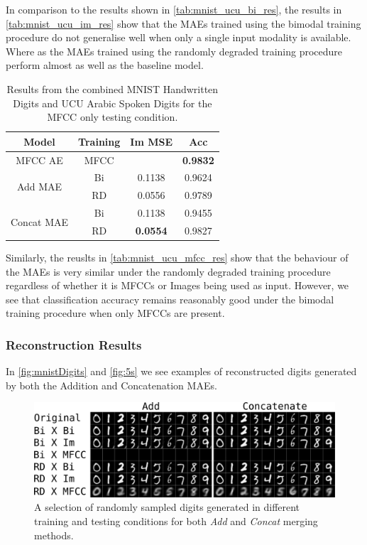 In comparison to the results shown in \autoref{tab:mnist_ucu_bi_res}, the results in \autoref{tab:mnist_ucu_im_res} show that the MAEs trained using the bimodal training procedure do not generalise well when only a single input modality is available. Where as the MAEs trained using the randomly degraded training procedure perform almost as well as the baseline model. 
\begin{table}
	\centering
		\begin{tabular}{|c|c|c|c|}
		\hline
		Model & Training & Im MSE &  Acc \\ \hline
				
				MFCC AE & MFCC & 					& 	\textbf{0.9832}	\\ \hline		
\multirow{2}{*}{Add MAE} & Bi & 	0.1138			& 	0.9624 			\\ \cline{2-4}
						  & RD &	0.0556			&	0.9789			\\ \hline	
		
\multirow{2}{*}{Concat MAE} & Bi &	0.1138			&	0.9455			\\ \cline{2-4}		
							 & RD & \textbf{0.0554}	& 	0.9827 			\\ \hline
		\end{tabular}
		\caption{Results from the combined MNIST Handwritten Digits and UCU Arabic Spoken Digits for the MFCC only testing condition.}
		\label{tab:mnist_ucu_mfcc_res}

\end{table}

Similarly, the reuslts in \autoref{tab:mnist_ucu_mfcc_res} show that the behaviour of the MAEs is very similar under the randomly degraded training procedure regardless of whether it is MFCCs or Images being used as input. However, we see that classification accuracy remains reasonably good under the bimodal training procedure when only MFCCs are present. 

\subsubsection{Reconstruction Results}

In \autoref{fig:mnistDigits} and \autoref{fig:5s} we see examples of reconstructed digits generated by both the Addition and Concatenation MAEs.
\begin{figure}
\begin{center}
	\includegraphics[width=\textwidth]{Figs/mnistSpoken/lbAll.png}
	\caption{A selection of randomly sampled digits generated in different training and testing conditions for both \textit{Add} and \textit{Concat} merging methods.}
	\label{fig:mnistDigits}
\end{center}
\end{figure}

